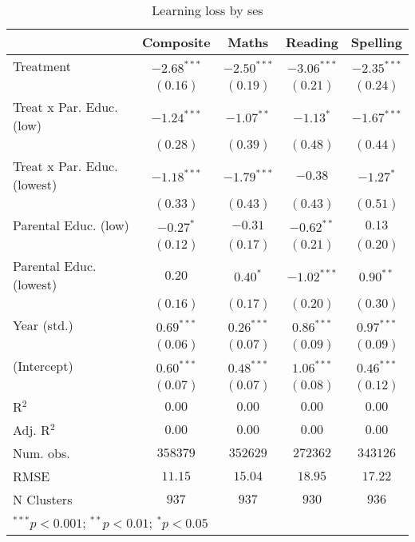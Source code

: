 
\begin{table}
\begin{center}
\begin{tabular}{l c c c c}
\hline
 & Composite & Maths & Reading & Spelling \\
\hline
Treatment                   & $-2.68^{***}$ & $-2.50^{***}$ & $-3.06^{***}$ & $-2.35^{***}$ \\
                            & $(0.16)$      & $(0.19)$      & $(0.21)$      & $(0.24)$      \\
Treat x Par. Educ. (low)    & $-1.24^{***}$ & $-1.07^{**}$  & $-1.13^{*}$   & $-1.67^{***}$ \\
                            & $(0.28)$      & $(0.39)$      & $(0.48)$      & $(0.44)$      \\
Treat x Par. Educ. (lowest) & $-1.18^{***}$ & $-1.79^{***}$ & $-0.38$       & $-1.27^{*}$   \\
                            & $(0.33)$      & $(0.43)$      & $(0.43)$      & $(0.51)$      \\
Parental Educ. (low)        & $-0.27^{*}$   & $-0.31$       & $-0.62^{**}$  & $0.13$        \\
                            & $(0.12)$      & $(0.17)$      & $(0.21)$      & $(0.20)$      \\
Parental Educ. (lowest)     & $0.20$        & $0.40^{*}$    & $-1.02^{***}$ & $0.90^{**}$   \\
                            & $(0.16)$      & $(0.17)$      & $(0.20)$      & $(0.30)$      \\
Year (std.)                 & $0.69^{***}$  & $0.26^{***}$  & $0.86^{***}$  & $0.97^{***}$  \\
                            & $(0.06)$      & $(0.07)$      & $(0.09)$      & $(0.09)$      \\
(Intercept)                 & $0.60^{***}$  & $0.48^{***}$  & $1.06^{***}$  & $0.46^{***}$  \\
                            & $(0.07)$      & $(0.07)$      & $(0.08)$      & $(0.12)$      \\
\hline
R$^2$                       & $0.00$        & $0.00$        & $0.00$        & $0.00$        \\
Adj. R$^2$                  & $0.00$        & $0.00$        & $0.00$        & $0.00$        \\
Num. obs.                   & $358379$      & $352629$      & $272362$      & $343126$      \\
RMSE                        & $11.15$       & $15.04$       & $18.95$       & $17.22$       \\
N Clusters                  & $937$         & $937$         & $930$         & $936$         \\
\hline
\multicolumn{5}{l}{\scriptsize{$^{***}p<0.001$; $^{**}p<0.01$; $^{*}p<0.05$}}
\end{tabular}
\caption{Learning loss by ses}
\label{tableses}
\end{center}
\end{table}
